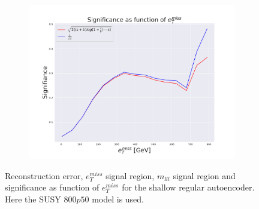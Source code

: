 \begin{figure}[H]
    \hfill  
    \begin{subfigure}{.40\textwidth}
        \includegraphics[width=\textwidth]{Figures/AE_testing/small/2lep/significance_etmiss_800p0p050_-1.2087791708604207.pdf}
        \caption{}
        \label{fig:AE_2lep_small_signi_800_2}
    \end{subfigure}
    \hfill      
    \caption[2lep shallow network | $800p50$ | AE | 2]{Reconstruction error, $e_T^{miss}$ signal region, $m_{lll}$ signal region and significance as function of 
    $e_T^{miss}$ for the shallow regular autoencoder. Here the SUSY $800p50$ model is used.}
    \label{fig:AE_2lep_small_rec_sig_signi_800_2}
\end{figure}
























